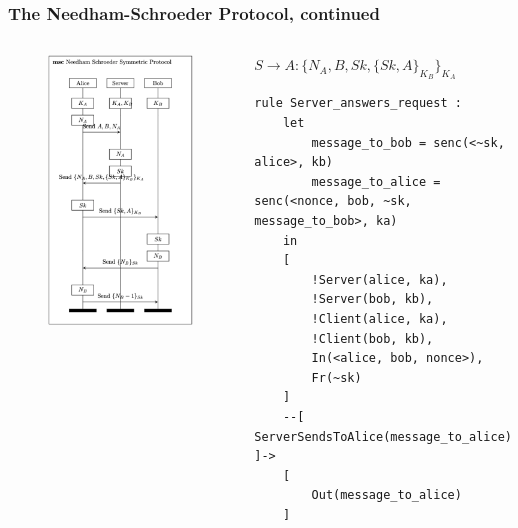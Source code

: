 \documentclass[aspectratio=169,t,xcolor=table]{beamer}
\begin{document}
\begin{frame}[fragile]
    \frametitle{The Needham-Schroeder Protocol, continued}
    \begin{columns}
        \begin{figure}
            \centering
            \includegraphics[width=.8\textwidth]{images/NS.png}
        \end{figure}
        \begin{block}{$S \to A: \{N_A, B, Sk, \{Sk, A\}_{K_B} \}_{K_A}$}
            \begin{lstlisting}[language=Tamarin]
rule Server_answers_request :
    let
        message_to_bob = senc(<~sk, alice>, kb)
        message_to_alice = senc(<nonce, bob, ~sk, message_to_bob>, ka)
    in
    [
        !Server(alice, ka),
        !Server(bob, kb),
        !Client(alice, ka),
        !Client(bob, kb),
        In(<alice, bob, nonce>),
        Fr(~sk)
    ]
    --[ ServerSendsToAlice(message_to_alice) ]->
    [
        Out(message_to_alice)
    ]\end{lstlisting}
        \end{block}
    \end{columns}
\end{frame}
\end{document}

